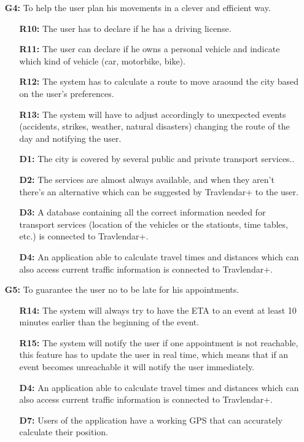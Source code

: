 \documentclass{article}
\begin{document}
\begin{enumerate}
\begin{enumerate}
\end{enumerate}
\item[\textbf{G4:}] To help the user plan his movements in a clever and efficient way.
\begin{enumerate}
\item[\textbf{R10:}] The user has to declare if he has a driving license.
\item[\textbf{R11:}] The user can declare if he owns a personal vehicle and indicate which kind of vehicle (car, motorbike, bike).
\item[\textbf{R12:}] The system has to calculate a route to move araound the city based on the user's preferences.
\item[\textbf{R13:}] The system will have to adjust accordingly to unexpected events (accidents, strikes, weather, natural disasters) changing the route of the day and notifying the user.
\item[\textbf{D1:}] The city is covered by several public and private transport services..
\item[\textbf{D2:}] The services are almost always available, and when they aren’t there’s an alternative which can be suggested by Travlendar+ to the user.
\item[\textbf{D3:}] A database containing all the correct information needed for transport services (location of the vehicles or the stationts, time tables, etc.) is connected to Travlendar+.
\item[\textbf{D4:}] An application able to calculate travel times and distances which can also access current traffic information is connected to Travlendar+.
\end{enumerate}
\item[\textbf{G5:}] To guarantee the user no to be late for his appointments.
\begin{enumerate}
\item[\textbf{R14:}] The system will always try to have the ETA to an event at least 10 minutes earlier than the beginning of the event.
\item[\textbf{R15:}] The system will notify the user if one appointment is not reachable, this feature has to update the user in real time, which means that if an event becomes unreachable it will notify the user immediately.
\item[\textbf{D4:}] An application able to calculate travel times and distances which can also access current traffic information is connected to Travlendar+.
\item[\textbf{D7:}] Users of the application have a working GPS that can accurately calculate their position.

\end{enumerate}
\end{enumerate}
\end{document}

